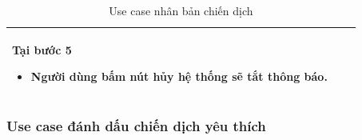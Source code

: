 \documentclass[12pt,a4paper]{article}
\begin{document}
\begin{table}[H]
\begin{tabular}{|p{3.5cm}|p{11.5cm}|c|}
            Tại bước 5\newline
            \vspace{-.8cm}\begin{itemize}
                              \item Người dùng bấm nút hủy hệ thống sẽ tắt thông báo.
            \end{itemize} \\
            \hline
        \end{tabular}
        \caption{Use case nhân bản chiến dịch}

    \end{table}


    \subsubsection*{Use case đánh dấu chiến dịch yêu thích}
\end{document}
